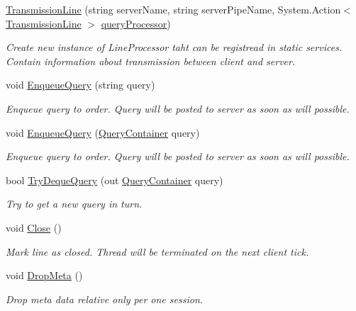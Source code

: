 \begin{DoxyCompactItemize}
\item 
\mbox{\hyperlink{class_pipes_provider_1_1_transmission_line_a9002723c5fa3ec06f81470390b7ef685}{Transmission\+Line}} (string server\+Name, string server\+Pipe\+Name, System.\+Action$<$ \mbox{\hyperlink{class_pipes_provider_1_1_transmission_line}{Transmission\+Line}} $>$ \mbox{\hyperlink{class_pipes_provider_1_1_transmission_line_a08bf6cb803ea32dd416afcc12ee866f5}{query\+Processor}})
\begin{DoxyCompactList}\small\item\em Create new instance of Line\+Processor taht can be registread in static services. Contain information about transmission between client and server. \end{DoxyCompactList}\item 
void \mbox{\hyperlink{class_pipes_provider_1_1_transmission_line_ac27fedfbe0edfdcb4fbf4509c76f858f}{Enqueue\+Query}} (string query)
\begin{DoxyCompactList}\small\item\em Enqueue query to order. Query will be posted to server as soon as will possible. \end{DoxyCompactList}\item 
void \mbox{\hyperlink{class_pipes_provider_1_1_transmission_line_a59eceb9280548e1c9e662543ee5c96c7}{Enqueue\+Query}} (\mbox{\hyperlink{struct_pipes_provider_1_1_query_container}{Query\+Container}} query)
\begin{DoxyCompactList}\small\item\em Enqueue query to order. Query will be posted to server as soon as will possible. \end{DoxyCompactList}\item 
bool \mbox{\hyperlink{class_pipes_provider_1_1_transmission_line_acc672e0d0c921f60a9a5920e3f76d28b}{Try\+Deque\+Query}} (out \mbox{\hyperlink{struct_pipes_provider_1_1_query_container}{Query\+Container}} query)
\begin{DoxyCompactList}\small\item\em Try to get a new query in turn. \end{DoxyCompactList}\item 
void \mbox{\hyperlink{class_pipes_provider_1_1_transmission_line_a4aa28b1d29a2b0b6fb2af6f046fdf56a}{Close}} ()
\begin{DoxyCompactList}\small\item\em Mark line as closed. Thread will be terminated on the next client tick. \end{DoxyCompactList}\item 
void \mbox{\hyperlink{class_pipes_provider_1_1_transmission_line_a954265d9816b253b75caf7b6b7e1ba86}{Drop\+Meta}} ()
\begin{DoxyCompactList}\small\item\em Drop meta data relative only per one session. \end{DoxyCompactList}\end{DoxyCompactItemize}
